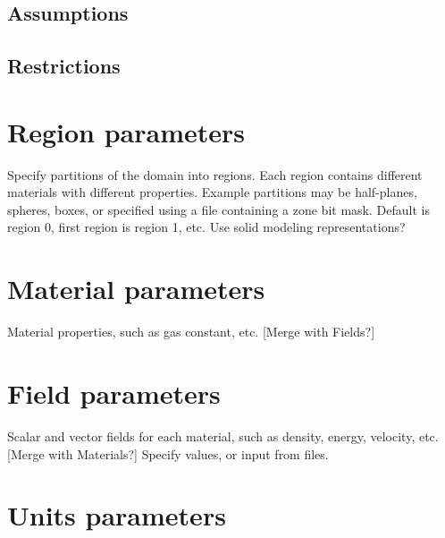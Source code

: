 \documentclass{book}
\begin{document}
\subsection{Assumptions}
\subsection{Restrictions}


\section{Region parameters} \label{s:region}

Specify partitions of the domain into regions.  Each region contains
different materials with different properties.  Example partitions may
be half-planes, spheres, boxes, or specified using a file containing a
zone bit mask.  Default is region 0, first region is region 1, etc.
Use solid modeling representations?

\section{Material parameters} \label{s:material}

 Material properties, such as gas constant, etc.
 [Merge with Fields?]

\section{Field parameters} \label{s:field}

Scalar and vector fields for each material, such as
 density, energy, velocity, etc.  [Merge with Materials?]  Specify
 values, or input from files.

\section{Units parameters} \label{s:units}
\end{document}
